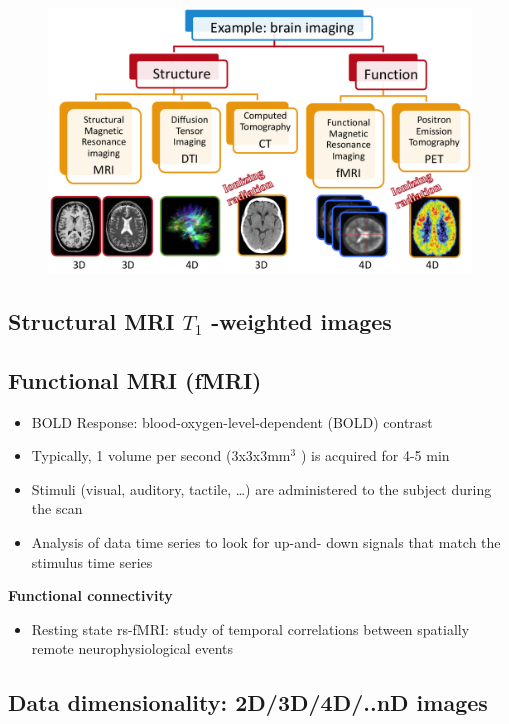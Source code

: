 \begin{figure}[ht]
	\centering
	\includegraphics[width=1\linewidth]{figure_med/data_dim}
\end{figure}
\FloatBarrier

\subsection{Structural MRI $T_1$ -weighted images}

\subsection{Functional MRI (fMRI)}

\begin{itemize}
	\item BOLD Response: blood-oxygen-level-dependent (BOLD) contrast
	\item Typically, 1 volume per second (3x3x3mm$^3$ ) is
	acquired for 4-5 min
	\item Stimuli (visual, auditory, tactile, …) are
	administered to the subject during the scan
	\item Analysis of data time series to look for up-and-
	down signals that match the stimulus time
	series
\end{itemize}

\textbf{Functional connectivity}

\begin{itemize}
	\item Resting state rs-fMRI: study of temporal correlations between spatially remote neurophysiological events
\end{itemize}

\subsection{Data dimensionality: 2D/3D/4D/..nD images}

